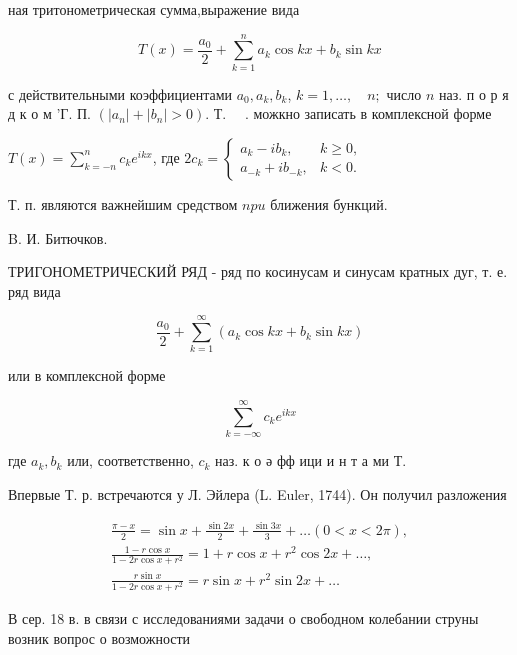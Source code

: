 \documentclass[10pt]{article}
\begin{document}
ная тритонометрическая сумма,выражение вида



\[

T(x)=\frac{a_{0}}{2}+\sum_{k=1}^{n} a_{k} \cos k x+b_{k} \sin k x

\]



с действительными коэффициентами $a_{0}, a_{k}, b_{k}$, $k=1, \ldots, \quad n ;$ число $n$ наз. п о р я д к о м 'Г. П. $\left(\left|a_{n}\right|+\left|b_{n}\right|>0\right)$. Т. $\quad$. можкно записать в комплексной форме



$T(x)=\sum_{k=-n}^{n} c_{k} e^{i k x}$, где $2 c_{k}=\left\{\begin{array}{cc}a_{k}-i b_{k}, & k \geqslant 0, \\ a_{-k}+i b_{-k}, & k<0 .\end{array}\right.$



Т. п. являются важнейшим средством $n p u$ ближения бункций.



B. И. Битючков.



ТРИГОНОМЕТРИЧЕСКИЙ РЯД - ряд по косинусам и синусам кратных дуг, т. е. ряд вида



\[

\frac{a_{0}}{2}+\sum_{k=1}^{\infty}\left(a_{k} \cos k x+b_{k} \sin k x\right)

\]



или в комплексной форме



\[

\sum_{k=-\infty}^{\infty} c_{k} e^{i k x}

\]



где $a_{k}, b_{k}$ или, соответственно, $c_{k}$ наз. к о ә фф ици и н т а ми Т.



Впервые Т. р. встречаются у Л. Эйлера (L. Euler, 1744). Он получил разложения



\[

\begin{gathered}

\frac{\pi-x}{2}=\sin x+\frac{\sin 2 x}{2}+\frac{\sin 3 x}{3}+\ldots(0<x<2 \pi), \\

\frac{1-r \cos x}{1-2 r \cos x+r^{2}}=1+r \cos x+r^{2} \cos 2 x+\ldots, \\

\frac{r \sin x}{1-2 r \cos x+r^{2}}=r \sin x+r^{2} \sin 2 x+\ldots

\end{gathered}

\]



В сер. 18 в. в связи с исследованиями задачи о свободном колебании струны возник вопрос о возможности
\end{document}
